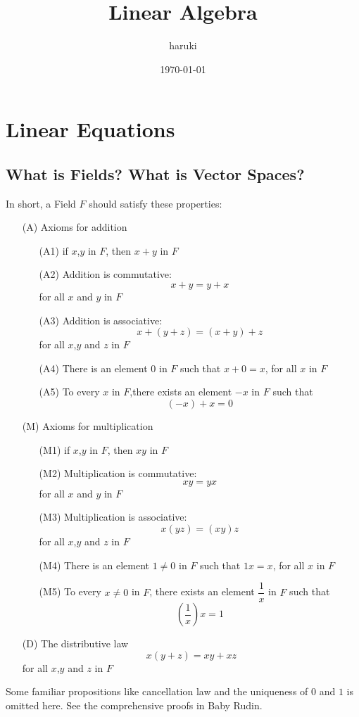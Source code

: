 \documentclass{article}
\title{Linear Algebra}
\author{haruki}
\date{\today}
\begin{document}
\maketitle
\tableofcontents
\newpage
\section{Linear Equations}\label{1}
\subsection{What is Fields? What is Vector Spaces?}
\noindent In short, a Field $F$ should satisfy these properties:
\begin{enumerate}
	\item[(A)] Axioms for addition
	\begin{enumerate}
		\item[(A1)] if $x$,$y$ in $F$, then $x+y$ in $F$
	    \item[(A2)] Addition is commutative:\[x+y=y+x\]for all $x$ and $y$ in $F$
	    \item[(A3)] Addition is associative:\[x+(y+z)=(x+y)+z\]for all $x$,$y$ and $z$ in $F$
	    \item[(A4)] There is an element $0$ in $F$ such that $x+0=x$, for all $x$ in $F$
	    \item[(A5)] To every $x$ in $F$,there exists an element $-x$ in $F$ such that \[(-x)+x=0\]
	\end{enumerate}
	\item[(M)] Axioms for multiplication
	\begin{enumerate}
		\item[(M1)] if $x$,$y$ in $F$, then $xy$ in $F$
		\item[(M2)] Multiplication is commutative:\[xy=yx\]for all $x$ and $y$ in $F$
		\item[(M3)] Multiplication is associative:\[x(yz)=(xy)z\]for all $x$,$y$ and $z$ in $F$
		\item[(M4)] There is an element $1\neq 0$ in $F$ such that $1x=x$, for all $x$ in $F$
		\item[(M5)] To every $x\neq 0$ in $F$, there exists an element $\dfrac{1}{x}$ in $F$ such that \[(\frac{1}{x})x=1\]
	\end{enumerate}
	\item[(D)] The distributive law\[x(y+z)=xy+xz\]for all $x$,$y$ and $z$ in $F$
\end{enumerate}
\indent Some familiar propositions like cancellation law and the uniqueness of $0$ and $1$ is omitted here. See the comprehensive proofs in Baby Rudin.\\
\end{document}
